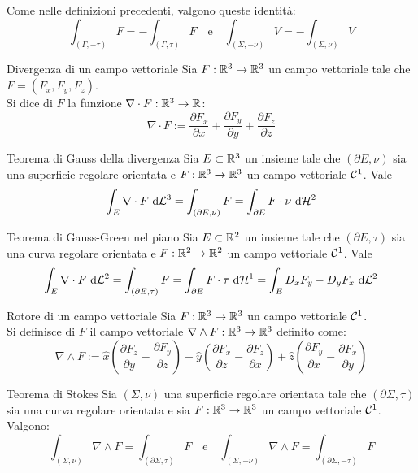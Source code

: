 \documentclass{article}
\begin{document}
\begin{remark}{}{}
    Come nelle definizioni precedenti, valgono queste identità:
    \[\int_{(\Gamma,-\tau)} F = - \int_{(\Gamma,\tau)} F \quad \text{e} \quad \int_{(\Sigma,-\nu)} V = - \int_{(\Sigma,\nu)} V\]
\end{remark}

\begin{definition}{Divergenza di un campo vettoriale}{}
    Sia $F:\mathbb{R}^3 \to \mathbb{R}^3$ un campo vettoriale tale che $F = (F_x, F_y, F_z)$.\\
    Si dice  di $F$ la funzione $\nabla \cdot F : \mathbb{R}^3 \to \mathbb{R}$:
    \[\nabla \cdot F := \frac{\partial F_x}{\partial x} + \frac{\partial F_y}{\partial y} + \frac{\partial F_z}{\partial z}\]
\end{definition}

\begin{theorem}{Teorema di Gauss della divergenza}{}
    Sia $E\subset \mathbb{R}^3$ un insieme tale che $(\partial E, \nu)$ sia una superficie regolare orientata e $F:\mathbb{R}^3 \to \mathbb{R}^3$ un campo vettoriale $\mathcal{C}^1$. Vale
    \[\int_E \nabla \cdot F \text{ d} \mathcal{L}^3 = \int_{(\partial E, \nu)} F = \int_{\partial E} F \cdot \nu \text{ d} \mathcal{H}^2 \]
\end{theorem}

\begin{theorem}{Teorema di Gauss-Green nel piano}{}
    Sia $E \subset \mathbb{R}^2$ un insieme tale che $(\partial E, \tau)$ sia una curva regolare orientata e $F : \mathbb{R}^2 \to \mathbb{R}^2$ un campo vettoriale $\mathcal{C}^1$. Vale
    \[\int_E \nabla \cdot F \text{ d} \mathcal{L}^2 = \int_{(\partial E, \tau)} F = \int_{\partial E} F \cdot \tau \text{ d} \mathcal{H}^1 = \int_E D_xF_y - D_yF_x \text{ d} \mathcal{L}^2\]
\end{theorem}

\begin{definition}{Rotore di un campo vettoriale}{}
    Sia $F:\mathbb{R}^3 \to \mathbb{R}^3$ un campo vettoriale $\mathcal{C}^1$.\\
    Si definisce  di $F$ il campo vettoriale $\nabla \wedge F : \mathbb{R}^3 \to \mathbb{R}^3$ definito come:
    \[\nabla \wedge F := \hat{x}\left(\frac{\partial F_z}{\partial y} - \frac{\partial F_y}{\partial z} \right) + \hat{y}\left( \frac{\partial F_x}{\partial z} - \frac{\partial F_z}{\partial x} \right) + \hat{z}\left(\frac{\partial F_y}{\partial x} - \frac{\partial F_x}{\partial y}\right)\]
\end{definition}

\begin{theorem}{Teorema di Stokes}{}
    Sia $(\Sigma,\nu)$ una superficie regolare orientata tale che $(\partial\Sigma,\tau)$ sia una curva regolare orientata e sia $F:\mathbb{R}^3 \to \mathbb{R}^3$ un campo vettoriale $\mathcal{C}^1$. Valgono:
    \[\int_{(\Sigma,\nu)} \nabla \wedge F = \int_{(\partial\Sigma,\tau)} F \quad \text{e} \quad \int_{(\Sigma,-\nu)} \nabla \wedge F = \int_{(\partial\Sigma,-\tau)} F\]
\end{theorem}
\end{document}
